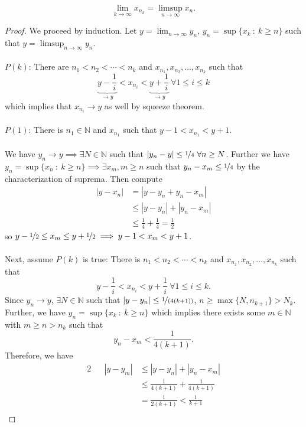\documentclass{article}
\newcommand{\N}{\mathbb{N}}
\newcommand{\?}{\stackrel{?}{=}}
\begin{document}
\begin{itemize}
    $$\lim_{k \to \infty} x_{n_k} = \limsup_{n \to \infty} x_n.$$
    \begin{proof}
        We proceed by induction. Let $y = \lim_{n \to \infty} y_n$, $y_n = \sup\{x_k \ : \ k \geq n\}$ such that $y = \limsup_{n \to \infty} y_n$. \\\\
        $P(k)$: There are $n_1 < n_2 < \cdots < n_k$ and $x_{n_1}, x_{n_2}, \ldots, x_{n_k}$ such that
        $$\underbrace{y - \frac{1}{i}}_{\rightarrow y} < x_{n_i} < \underbrace{y + \frac{1}{i}}_{\rightarrow y} \ \forall 1 \leq i \leq k$$
        which implies that $x_{n_i} \rightarrow y$ as well by squeeze theorem. \\\\
        $P(1)$: There is $n_1 \in \N$ and $x_{n_1}$ such that $y - 1 < x_{n_1} < y + 1$. \\\\
        We have $y_n \rightarrow y \implies \exists N \in \N$ such that $|y_n - y| \leq \nicefrac{1}{4} \ \forall n \geq N$. Further we have $y_n = \sup\{x_n \ : \ k \geq n\} \implies \exists x_m, m \geq n$ such that $y_n - x_m \leq \nicefrac{1}{4}$ by the characterization of suprema. Then compute
        \begin{align*}
            |y - x_n| &= |y - y_n + y_n - x_m| \\
            &\leq |y - y_n| + |y_n - x_m| \\
            &\leq \frac{1}{4} + \frac{1}{4} = \frac{1}{2}
        \end{align*}
        so $y - \nicefrac{1}{2} \leq x_m \leq y + \nicefrac{1}{2} \implies y - 1 < x_m < y + 1$. \\\\ 
        Next, assume $P(k)$ is true: There is $n_1 < n_2 < \cdots < n_k$ and $x_{n_1}, x_{n_2}, \ldots, x_{n_k}$ such that
        $$y - \frac{1}{i} < x_{n_i} < y + \frac{1}{i} \ \forall 1 \leq i \leq k.$$
        Since $y_n \rightarrow y$, $\exists N \in \N$ such that $|y - y_n| \leq \nicefrac{1}{(4(k + 1))}$, $n \geq \max\{N, n_{k + 1}\} > N_k$. Further, we have $y_n = \sup\{x_k \ : \ k \geq n\}$ which implies there exists some $m \in \N$ with $m \geq n > n_k$ such that
        $$y_n - x_m < \frac{1}{4(k + 1)}.$$
        Therefore, we have
        \begin{alignat*}{2}
            && |y - y_m| &\leq |y - y_n| + |y_n - x_m| \\
            && &\leq \frac{1}{4(k + 1)} + \frac{1}{4(k + 1)} \\
            && &= \frac{1}{2(k + 1)} < \frac{1}{k + 1} \\

\end{alignat*}
\end{proof}
\end{itemize}
\end{document}
